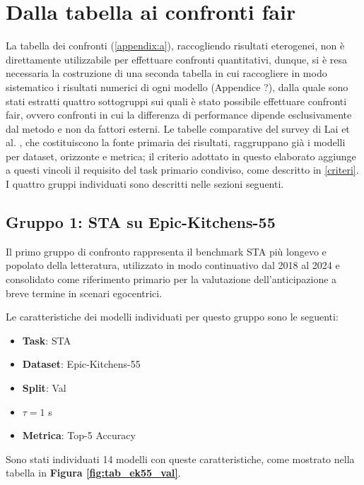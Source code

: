 \section{Dalla tabella ai confronti fair}
La tabella dei confronti (\autoref{appendix:a}), raccogliendo risultati eterogenei, non è direttamente utilizzabile per effettuare confronti quantitativi, dunque, si è resa necessaria la costruzione di una seconda tabella in cui raccogliere in modo sistematico i risultati numerici di ogni modello (Appendice ?), dalla quale sono stati estratti quattro sottogruppi sui quali è stato possibile effettuare confronti fair, ovvero confronti in cui la differenza di performance dipende esclusivamente dal metodo e non da fattori esterni.
Le tabelle comparative del survey di Lai et al. \cite{lai2024human}, che costituiscono la fonte primaria dei risultati, raggruppano già i modelli per dataset, orizzonte e metrica; il criterio adottato in questo elaborato aggiunge a questi vincoli il requisito del task primario condiviso, come descritto in \ref{criteri}. I quattro gruppi individuati sono descritti nelle sezioni seguenti.

\subsection{Gruppo 1: STA su Epic-Kitchens-55}
Il primo gruppo di confronto rappresenta il benchmark STA più longevo e popolato della letteratura, utilizzato in modo continuativo dal 2018 al 2024 e consolidato come riferimento primario per la valutazione dell'anticipazione a breve termine in scenari egocentrici.

Le caratteristiche dei modelli individuati per questo gruppo sono le seguenti:
\begin{itemize}
    \item \textbf{Task}: STA
    \item \textbf{Dataset}: Epic-Kitchens-55
    \item \textbf{Split}: Val
    \item $\tau = 1$ s
    \item \textbf{Metrica}: Top-5 Accuracy
\end{itemize}
Sono stati individuati 14 modelli con queste caratteristiche, come mostrato nella tabella in \textbf{Figura \ref{fig:tab_ek55_val}}.


